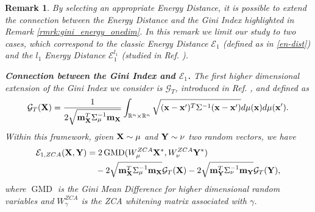 \documentclass{article}
\def\bx{{\bf x}}
\def\bX{{\bf X}}
\def\bY{{\bf Y}}
\def\bm{{\bf m}}
\DeclareMathOperator{\GMD}{GMD}
\def \erre{\mathbb{R}}
\newtheorem{remark}{Remark}
\begin{document}
\begin{remark}
    By selecting an appropriate Energy Distance, it is possible to extend the connection between the Energy Distance and the Gini Index highlighted in Remark \ref{rmrk:gini_energy_onedim}.
    In this remark we limit our study to two cases, which correspond to the classic Energy Distance $\mathcal{E}_1$ (defined as in \eqref{en-dist}) and the $l_1$ Energy Distance $\mathcal{E}^{l_1}_1$ (studied in Ref. \cite{AGTB:IJCNN}).

    \textbf{Connection between the Gini Index and $\mathcal{E}_1$.}
    The first higher dimensional extension of the Gini Index we consider is $\mathcal{G}_T$, introduced in Ref. \cite{giudici2024measuring}, and defined as  
    \begin{equation}
        \mathcal{G}_T(\bX)=\frac{1}{2\sqrt{\bm_{\bX}^T\Sigma^{-1}_\mu\bm_{\bX}}}\int_{\erre^n\times\erre^n}\sqrt{(\bx-\bx')^T\Sigma^{-1}(\bx-\bx')}d\mu(\bx)d\mu(\bx').
    \end{equation}
    Within this framework, given $\bX\sim\mu$ and $\bY\sim\nu$ two random vectors, we have
    \begin{align*}
        \mathcal{E}_{1,ZCA}(\bX,\bY)&=2\GMD(W^{ZCA}_\mu\bX^*,W^{ZCA}_\nu\bY^*)\\
        &\quad-2\sqrt{\bm_{\bX}^T\Sigma^{-1}_\mu\bm_{\bX}}\mathcal{G}_T(\bX)-2\sqrt{\bm_{\bY}^T\Sigma^{-1}_\nu\bm_{\bY}}\mathcal{G}_T(\bY),
    \end{align*}
    where $\GMD$ is the Gini Mean Difference for higher dimensional random variables and $W^{ZCA}_\gamma$ is the ZCA whitening matrix associated with $\gamma$.
   


\end{remark}
\end{document}

